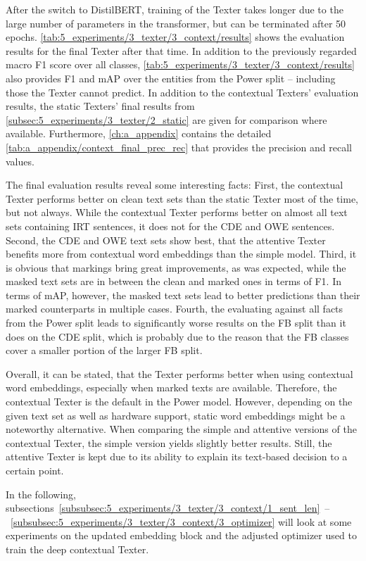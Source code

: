 After the switch to DistilBERT, training of the Texter takes longer due to the large number of parameters in the transformer, but can be terminated after 50 epochs. \autoref{tab:5_experiments/3_texter/3_context/results} shows the evaluation results for the final Texter after that time. In addition to the previously regarded macro F1 score over all classes, \autoref{tab:5_experiments/3_texter/3_context/results} also provides F1 and mAP over the entities from the Power split -- including those the Texter cannot predict. In addition to the contextual Texters' evaluation results, the static Texters' final results from \autoref{subsec:5_experiments/3_texter/2_static} are given for comparison where available. Furthermore, \autoref{ch:a_appendix} contains the detailed \autoref{tab:a_appendix/context_final_prec_rec} that provides the precision and recall values.

The final evaluation results reveal some interesting facts: First, the contextual Texter performs better on clean text sets than the static Texter most of the time, but not always. While the contextual Texter performs better on almost all text sets containing IRT sentences, it does not for the CDE and OWE sentences. Second, the CDE and OWE text sets show best, that the attentive Texter benefits more from contextual word embeddings than the simple model. Third, it is obvious that markings bring great improvements, as was expected, while the masked text sets are in between the clean and marked ones in terms of F1. In terms of mAP, however, the masked text sets lead to better predictions than their marked counterparts in multiple cases. Fourth, the evaluating against all facts from the Power split leads to significantly worse results on the FB split than it does on the CDE split, which is probably due to the reason that the FB classes cover a smaller portion of the larger FB split.

Overall, it can be stated, that the Texter performs better when using contextual word embeddings, especially when marked texts are available. Therefore, the contextual Texter is the default in the Power model. However, depending on the given text set as well as hardware support, static word embeddings might be a noteworthy alternative. When comparing the simple and attentive versions of the contextual Texter, the simple version yields slightly better results. Still, the attentive Texter is kept due to its ability to explain its text-based decision to a certain point.

In the following, subsections~\ref{subsubsec:5_experiments/3_texter/3_context/1_sent_len}~--~\ref{subsubsec:5_experiments/3_texter/3_context/3_optimizer} will look at some experiments on the updated embedding block and the adjusted optimizer used to train the deep contextual Texter.

